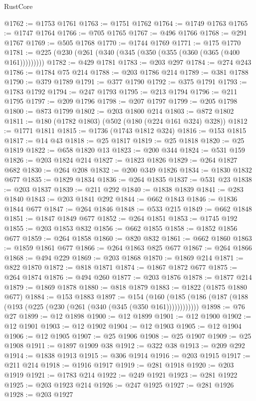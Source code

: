 \begin{lexlean}{RustCore}
\begin{coremodule}
@1762 := @1753 @1761
@1763 := @1751 @1762
@1764 := @1749 @1763
@1765 := @1747 @1764
@1766 := @705 @1765
@1767 := @496 @1766
@1768 := @291 @1767
@1769 := @505 @1768
@1770 := @1744 @1769
@1771 := @175 @1770
@1781 := @225 (@230 (@261 (@340 (@345 (@350 (@355 (@360 (@365 (@400 @161)))))))))
@1782 := @429 @1781
@1783 := @203 @297
@1784 := @274 @243
@1786 := @1784 @75 @214
@1788 := @203 @1786 @214
@1789 := @381 @1788
@1790 := @379 @1789
@1791 := @377 @1790
@1792 := @375 @1791
@1793 := @1783 @1792
@1794 := @247 @1793
@1795 := @213 @1794
@1796 := @211 @1795
@1797 := @209 @1796
@1798 := @207 @1797
@1799 := @205 @1798
@1800 := @873 @1799
@1802 := @203 @1800 @214
@1803 := @872 @1802
@1811 := @180 (@1782 @1803) (@502 (@180 (@224 @161 @324) @328))
@1812 := @1771 @1811
@1815 := @1736 (@1743 @1812 @324)
@1816 := @153 @1815
@1817 := @14 @43
@1818 := @25 @1817
@1819 := @25 @1818
@1820 := @25 @1819
@1822 := @658 @1820 @13
@1823 := @200 @344
@1824 := @531 @159
@1826 := @203 @1824 @214
@1827 := @1823 @1826
@1829 := @264 @1827 @682
@1830 := @264 @208
@1832 := @200 @349 @1826
@1834 := @1830 @1832 @677
@1835 := @1829 @1834
@1836 := @264 @1835
@1837 := @531 @23
@1838 := @203 @1837
@1839 := @211 @292
@1840 := @1838 @1839
@1841 := @283 @1840
@1843 := @203 @1841 @292
@1844 := @662 @1843
@1846 := @1836 @1844 @677
@1847 := @264 @1846
@1848 := @533 @215
@1849 := @662 @1848
@1851 := @1847 @1849 @677
@1852 := @264 @1851
@1853 := @1745 @192
@1855 := @203 @1853 @832
@1856 := @662 @1855
@1858 := @1852 @1856 @677
@1859 := @264 @1858
@1860 := @820 @832
@1861 := @662 @1860
@1863 := @1859 @1861 @677
@1866 := @264 @1863 @825 @677
@1867 := @264 @1866
@1868 := @494 @229
@1869 := @203 @1868
@1870 := @1869 @214
@1871 := @822 @1870
@1872 := @818 @1871
@1874 := @1867 @1872 @677
@1875 := @264 @1874
@1876 := @494 @260
@1877 := @203 @1876
@1878 := @1877 @214
@1879 := @1869 @1878
@1880 := @818 @1879
@1883 := @1822 (@1875 @1880 @677)
@1884 := @153 @1883
@1897 := @154
    (@160 (@185 (@186 (@187 (@188 (@193 (@225 (@230 (@261 (@340 (@345 (@350 @161))))))))))))
@1898 := @76 @27
@1899 := @12 @1898
@1900 := @12 @1899
@1901 := @12 @1900
@1902 := @12 @1901
@1903 := @12 @1902
@1904 := @12 @1903
@1905 := @12 @1904
@1906 := @12 @1905
@1907 := @25 @1906
@1908 := @25 @1907
@1909 := @25 @1908
@1911 := @1897 @1909 @38
@1912 := @322 @38
@1913 := @209 @292
@1914 := @1838 @1913
@1915 := @306 @1914
@1916 := @203 @1915
@1917 := @211 @214
@1918 := @1916 @1917
@1919 := @281 @1918
@1920 := @203 @1919
@1921 := @1783 @214
@1922 := @249 @1921
@1923 := @281 @1922
@1925 := @203 @1923 @214
@1926 := @247 @1925
@1927 := @281 @1926
@1928 := @203 @1927

\end{coremodule}
\end{lexlean}
